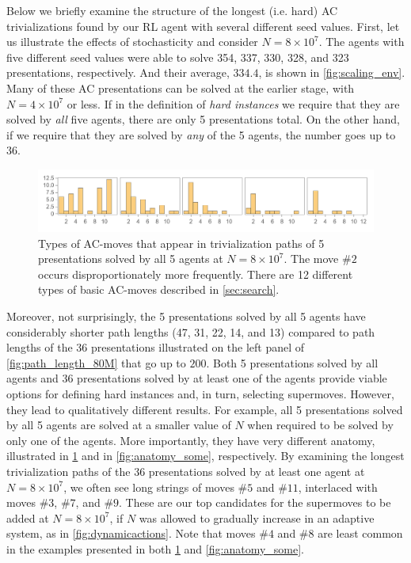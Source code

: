 Below we briefly examine the structure of the longest (i.e. hard) AC trivializations found by our RL agent with several different seed values. First, let us illustrate the effects of stochasticity and consider $N=8 \times 10^7$. The agents with five different seed values were able to solve 354, 337, 330, 328, and 323 presentations, respectively. And their average, $334.4$, is shown in \cref{fig:scaling_env}. Many of these AC presentations can be solved at the earlier stage, with $N=4 \times 10^7$ or less. If in the definition of \textit{hard instances} we require that they are solved by \textit{all} five agents, there are only 5 presentations total. On the other hand, if we require that they are solved by \textit{any} of the 5 agents, the number goes up to 36.

\begin{figure}[h]
	\centering
	\includegraphics[scale=0.6]{fig/anatomy_all.png}
	\caption{Types of AC-moves that appear in trivialization paths of 5 presentations solved by all 5 agents at $N=8 \times 10^7$. The move $\# 2$ occurs disproportionately more frequently. There are 12 different types of basic AC-moves described in \cref{sec:search}.}
	\label{fig:anatomy_all}
\end{figure}

Moreover, not surprisingly, the 5 presentations solved by all 5 agents have considerably shorter path lengths (47, 31, 22, 14, and 13) compared to path lengths of the 36 presentations illustrated on the left panel of \cref{fig:path_length_80M} that go up to $200$. Both 5 presentations solved by all agents and 36 presentations solved by at least one of the agents provide viable options for defining hard instances and, in turn, selecting supermoves. However, they lead to qualitatively different results. For example, all 5 presentations solved by all 5 agents are solved at a smaller value of $N$ when required to be solved by only one of the agents. More importantly, they have very different anatomy, illustrated in \cref{fig:anatomy_all} and in \cref{fig:anatomy_some}, respectively.
By examining the longest trivialization paths of the 36 presentations solved by at least one agent at $N=8 \times 10^7$, we often see long strings of moves $\# 5$ and $\# 11$, interlaced with moves $\# 3$, $\# 7$, and $\# 9$. These are our top candidates for the supermoves to be added at $N=8 \times 10^7$, if $N$ was allowed to gradually increase in an adaptive system, as in \cref{fig:dynamicactions}. Note that moves $\# 4$ and $\# 8$ are least common in the examples presented in both \cref{fig:anatomy_all} and \cref{fig:anatomy_some}.

